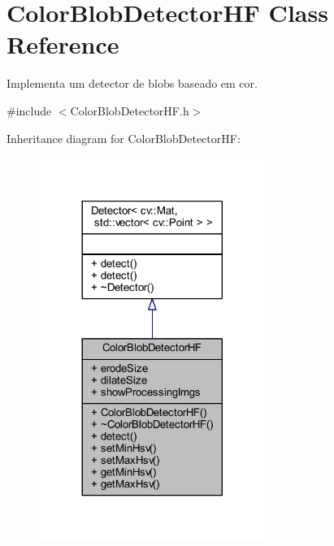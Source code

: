 \hypertarget{class_viscv_1_1_color_blob_detector_h_f}{}\section{Color\+Blob\+Detector\+H\+F Class Reference}
\label{class_viscv_1_1_color_blob_detector_h_f}


Implementa um detector de blobs baseado em cor.  




{\ttfamily \#include $<$Color\+Blob\+Detector\+H\+F.\+h$>$}



Inheritance diagram for Color\+Blob\+Detector\+H\+F\+:
\nopagebreak
\begin{figure}[H]
\begin{center}
\leavevmode
\includegraphics[width=209pt]{class_viscv_1_1_color_blob_detector_h_f__inherit__graph}
\end{center}
\end{figure}



